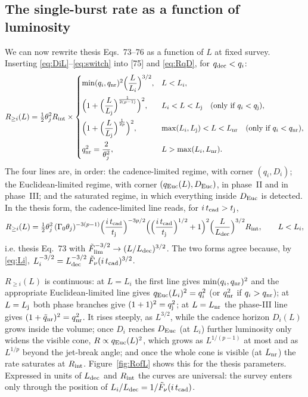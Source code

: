 \documentclass[11pt,a4paper]{article}
\newcommand{\tq}{\tilde{q}}
\newcommand{\tF}{\tilde{F}}
\newcommand{\Euc}{{\rm Euc}}
\newcommand{\dec}{{\rm dec}}
\newcommand{\nr}{{\rm nr}}
\newcommand{\tFlim}{\tilde{F}_{\rm lim}}
\newcommand{\Rint}{R_{\rm int}}
\newcommand{\tcad}{t_{\rm cad}}
\newcommand{\tj}{t_{\rm j}}
\newcommand{\Ldec}{L_{\rm dec}}
\newcommand{\Lj}{L_{\rm j}}
\newcommand{\Lnr}{L_{\rm nr}}
\begin{document}
\subsection{The single-burst rate as a function of luminosity}
\label{sec:RofL}

We can now rewrite thesis Eqs.~73--76 as a function of $L$ at fixed survey. Inserting \eqref{eq:DiL}--\eqref{eq:switch} into [75] and \eqref{eq:RqD}, for $q_\dec<q_i$:
\begin{equation}
\label{eq:RofL}
R_{\geq i}(L)=\tfrac12\theta_j^2\Rint\times\begin{cases}
\min(q_i,q_\nr)^2\Bigl(\dfrac{L}{L_i}\Bigr)^{3/2}, & L<L_i,\\[10pt]
\Bigl(1+\Bigl(\dfrac{L}{\Lj}\Bigr)^{\frac{1}{2(p-1)}}\Bigr)^2, & L_i<L<\Lj\quad(\text{only if }q_i<q_{\rm j}),\\[10pt]
\Bigl(1+\Bigl(\dfrac{L}{\Lj}\Bigr)^{\frac{1}{2p}}\Bigr)^2, & \max(L_i,\Lj)<L<\Lnr\quad(\text{only if }q_i<q_\nr),\\[10pt]
q_\nr^2=\dfrac{2}{\theta_j^2}, & L>\max(L_i,\Lnr) .
\end{cases}
\end{equation}
The four lines are, in order: the cadence-limited regime, with corner $(q_i,D_i)$; the Euclidean-limited regime, with corner $(q_\Euc(L),D_\Euc)$, in phase~II and in phase~III; and the saturated regime, in which everything inside $D_\Euc$ is detected. In the thesis form, the cadence-limited line reads, for $i\,\tcad>\tj$,
\begin{equation}
R_{\geq i}(L)=\tfrac12\theta_j^2\,(\Gamma_0\theta_j)^{-3(p-1)}\Bigl(\frac{i\,\tcad}{\tj}\Bigr)^{-3p/2}\Bigl(\Bigl(\frac{i\,\tcad}{\tj}\Bigr)^{1/2}+1\Bigr)^2\Bigl(\frac{L}{\Ldec}\Bigr)^{3/2}\Rint,\qquad L<L_i,
\end{equation}
i.e. thesis Eq.~73 with $\tFlim^{-3/2}\to(L/\Ldec)^{3/2}$. The two forms agree because, by \eqref{eq:Li}, $L_i^{-3/2}=\Ldec^{-3/2}\,\tF_\nu(i\,\tcad)^{3/2}$.

$R_{\geq i}(L)$ is continuous: at $L=L_i$ the first line gives $\min(q_i,q_\nr)^2$ and the appropriate Euclidean-limited line gives $q_\Euc(L_i)^2=q_i^2$ (or $q_\nr^2$ if $q_i>q_\nr$); at $L=\Lj$ both phase branches give $(1+1)^2=q_{\rm j}^2$; at $L=\Lnr$ the phase-III line gives $(1+\tq_\nr)^2=q_\nr^2$. It rises steeply, as $L^{3/2}$, while the cadence horizon $D_i(L)$ grows inside the volume; once $D_i$ reaches $D_\Euc$ (at $L_i$) further luminosity only widens the visible cone, $R\propto q_\Euc(L)^2$, which grows as $L^{1/(p-1)}$ at most and as $L^{1/p}$ beyond the jet-break angle; and once the whole cone is visible (at $\Lnr$) the rate saturates at $\Rint$. Figure~\ref{fig:RofL} shows this for the thesis parameters. Expressed in units of $\Ldec$ and $\Rint$ the curves are universal: the survey enters only through the position of $L_i/\Ldec=1/\tF_\nu(i\,\tcad)$.
\end{document}
